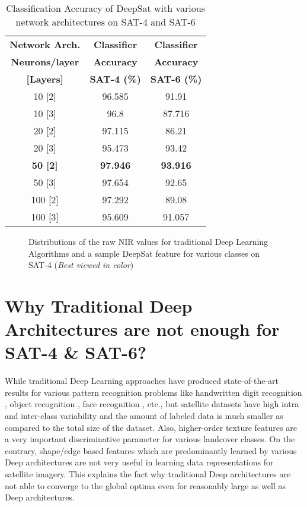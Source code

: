 \documentclass[11pt,a4paper]{article}
\begin{document}
\begin{table}[h!]
\centering
\begin{tabular}{ | c | c | c | }
    \hline
    \textbf{Network Arch.} & \textbf{Classifier} & \textbf{Classifier}\\ 
    \textbf{Neurons/layer} &   \textbf{Accuracy} & \textbf{Accuracy} \\ 
    \textbf{[Layers]} & \textbf{SAT-4 (\%)} & \textbf{SAT-6 (\%)} \\ \hline
    10 [2] & 96.585 & 91.91\\ \hline
    10 [3] & 96.8  & 87.716 \\ \hline
    20 [2] & 97.115 & 86.21 \\ \hline
    20 [3] & 95.473 & 93.42 \\ \hline
    \textbf{50 [2]} & \textbf{97.946} &\textbf{93.916} \\ \hline
    50 [3] & 97.654 & 92.65 \\ \hline
    100 [2] & 97.292 & 89.08 \\ \hline
    100 [3] & 95.609 & 91.057 \\ \hline
  \end{tabular}
  \caption{Classification Accuracy of DeepSat with various network architectures on SAT-4 and SAT-6}
  \label{table:DeepSat_accuracy_SAT_4_and_6}
\end{table}

\begin{figure*}
\centering
{}
\caption{Distributions of the raw NIR values for traditional Deep Learning Algorithms and a sample DeepSat feature for various classes on SAT-4 (\emph{Best viewed in color})}
\label{fig:distributions}
\end{figure*}


\section{Why Traditional Deep Architectures are not enough for SAT-4  \& SAT-6?}
While traditional Deep Learning approaches have produced state-of-the-art results for various pattern recognition problems like handwritten digit recognition \cite{mnist}, object recognition \cite{Krizhevsky09learningmultiple}, face recognition \cite{DeepFace2013}, etc., but satellite datasets have high intra and inter-class variability and the amount of labeled data is much smaller as compared to the total size of the dataset. Also, higher-order texture features are a very important discriminative parameter for various landcover classes. On the contrary, shape/edge based features which are predominantly learned by various Deep architectures are not very useful in learning data representations for satellite imagery. This explains the fact why traditional Deep architectures are not able to converge to the global optima even for reasonably large as well as Deep architectures. 
\end{document}
